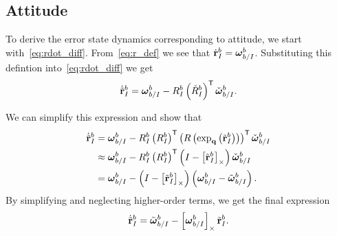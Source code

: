 

\subsection{Attitude}

To derive the error state dynamics corresponding to attitude, we start
with~\eqref{eq:rdot_diff}. From~\eqref{eq:r_def} we see that $\dot{\boldsymbol{\mathrm{r}}}_I^b
= \boldsymbol{\mathrm{\omega}}_{b/I}^b$. Substituting this defintion into~\eqref{eq:rdot_diff}
we get
\begin{equation}
\dot{\tilde{\boldsymbol{\mathrm{r}}}}_I^b = \boldsymbol{\mathrm{\omega}}_{b/I}^{b} -
R_I^b\left(\check{R}_I^b\right)^{\mathsf{T}} \check{\boldsymbol{\mathrm{\omega}}}_{b/I}^{b}.
\end{equation}

We can simplify this expression and show that
\begin{align}
  \dot{\tilde{\boldsymbol{\mathrm{r}}}}_I^b &= \boldsymbol{\mathrm{\omega}}_{b/I}^{b} -
  R_I^b 
  \left(R_{I}^{b}\right)^{\mathsf{T}}
  \left(R\left(\exp_{\boldsymbol{\mathrm{q}}}\left(\tilde{\boldsymbol{\mathrm{r}}}_{I}^{b}\right)\right)\right)^{\mathsf{T}}
  \check{\boldsymbol{\mathrm{\omega}}}_{b/I}^{b} \\
  &\approx \boldsymbol{\mathrm{\omega}}_{b/I}^{b} -
  R_I^b \left(R_{I}^{b}\right)^{\mathsf{T}} \left( I - \left[ \tilde{\boldsymbol{\mathrm{r}}}_I^b \right]_{\times}
  \right) \check{\boldsymbol{\mathrm{\omega}}}_{b/I}^{b} \\
  &= \boldsymbol{\mathrm{\omega}}_{b/I}^{b} -
  \left( I - \left[ \tilde{\boldsymbol{\mathrm{r}}}_I^b \right]_{\times}
  \right) \left(\boldsymbol{\mathrm{\omega}}_{b/I}^{b} - \tilde{\boldsymbol{\mathrm{\omega}}}_{b/I}^{b}\right).
\end{align}
By simplifying and neglecting higher-order terms, we get the final expression
\begin{equation}
  \dot{\tilde{\boldsymbol{\mathrm{r}}}}_I^b = \tilde{\boldsymbol{\mathrm{\omega}}}_{b/I}^{b} -
  \left[ \boldsymbol{\mathrm{\omega}}_{b/I}^{b}  \right]_{\times} \tilde{\boldsymbol{\mathrm{r}}}_I^b.
\end{equation}



